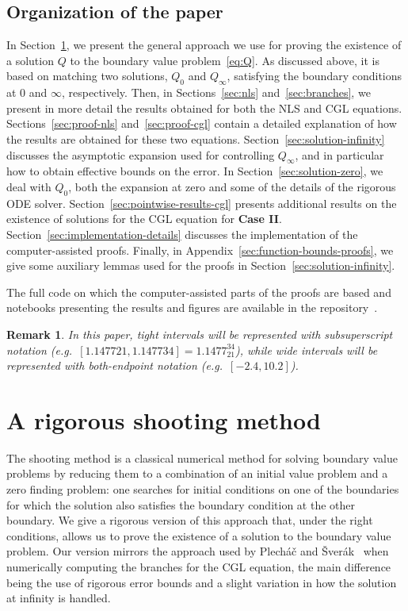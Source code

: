 \documentclass[11pt]{article}
\newtheorem{remark}[definition]{Remark}
\begin{document}
\subsection{Organization of the paper}
In Section~\ref{sec:shooting-method}, we present the general approach
we use for proving the existence of a solution \(Q\) to the boundary
value problem~\eqref{eq:Q}. As discussed above, it is based on
matching two solutions, \(Q_{0}\) and \(Q_{\infty}\), satisfying the
boundary conditions at \(0\) and \(\infty\), respectively. Then, in
Sections~\ref{sec:nls} and~\ref{sec:branches}, we present in more
detail the results obtained for both the NLS and CGL equations.
Sections~\ref{sec:proof-nls} and~\ref{sec:proof-cgl} contain a
detailed explanation of how the results are obtained for these two
equations. Section~\ref{sec:solution-infinity} discusses the
asymptotic expansion used for controlling \(Q_{\infty}\), and in
particular how to obtain effective bounds on the error. In
Section~\ref{sec:solution-zero}, we deal with \(Q_{0}\), both the
expansion at zero and some of the details of the rigorous ODE solver.
Section~\ref{sec:pointwise-results-cgl} presents additional results on
the existence of solutions for the CGL equation for \textbf{Case II}.
Section~\ref{sec:implementation-details} discusses the implementation
of the computer-assisted proofs. Finally, in
Appendix~\ref{sec:function-bounds-proofs}, we give some auxiliary
lemmas used for the proofs in Section~\ref{sec:solution-infinity}.

The full code on which the computer-assisted parts of the proofs are
based and notebooks presenting the results and figures are
available in the repository~\cite{CGL.jl}.

\begin{remark}
  In this paper, tight intervals will be represented with
  subsuperscript notation (e.g.\
  \([1.147721, 1.147734] = 1.1477_{21}^{34}\)), while wide intervals
  will be represented with both-endpoint notation (e.g.\
  \([-2.4, 10.2]\)).
\end{remark}

\section{A rigorous shooting method}
\label{sec:shooting-method}
The shooting method is a classical numerical method for solving
boundary value problems by reducing them to a combination of an
initial value problem and a zero finding problem: one searches for
initial conditions on one of the boundaries for which the solution
also satisfies the boundary condition at the other boundary. We give a
rigorous version of this approach that, under the right conditions,
allows us to prove the existence of a solution to the boundary value
problem. Our version mirrors the approach used by Plecháč and
Šverák~\cite{Plech2001} when numerically computing the branches for
the CGL equation, the main difference being the use of rigorous error
bounds and a slight variation in how the solution at infinity is
handled.
\end{document}
